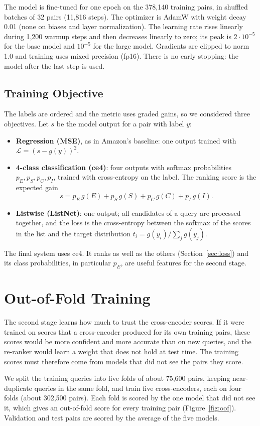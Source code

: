 \documentclass[12pt,a4paper]{report}
\begin{document}
The model is fine-tuned for one epoch on the 378,140 training pairs, in shuffled batches of 32 pairs (11,816 steps). The optimizer is AdamW with weight decay 0.01 (none on biases and layer normalization). The learning rate rises linearly during 1,200 warmup steps and then decreases linearly to zero; its peak is $2\cdot10^{-5}$ for the base model and $10^{-5}$ for the large model. Gradients are clipped to norm 1.0 and training uses mixed precision (fp16). There is no early stopping: the model after the last step is used.

\subsection{Training Objective}
The labels are ordered and the metric uses graded gains, so we considered three objectives. Let $s$ be the model output for a pair with label $y$:
\begin{itemize}
  \item \textbf{Regression (MSE)}, as in Amazon's baseline: one output trained with $\mathcal{L} = (s - g(y))^2$.
  \item \textbf{4-class classification (ce4)}: four outputs with softmax probabilities $p_E, p_S, p_C, p_I$, trained with cross-entropy on the label. The ranking score is the expected gain
  \[ s = p_E\,g(E) + p_S\,g(S) + p_C\,g(C) + p_I\,g(I). \]
  \item \textbf{Listwise (ListNet)}: one output; all candidates of a query are processed together, and the loss is the cross-entropy between the softmax of the scores in the list and the target distribution $t_i = g(y_i)/\sum_j g(y_j)$.
\end{itemize}
The final system uses ce4. It ranks as well as the others (Section~\ref{sec:loss}) and its class probabilities, in particular $p_E$, are useful features for the second stage.

\section{Out-of-Fold Training}
The second stage learns how much to trust the cross-encoder scores. If it were trained on scores that a cross-encoder produced for its own training pairs, these scores would be more confident and more accurate than on new queries, and the re-ranker would learn a weight that does not hold at test time. The training scores must therefore come from models that did not see the pairs they score.

We split the training queries into five folds of about 75,600 pairs, keeping near-duplicate queries in the same fold, and train five cross-encoders, each on four folds (about 302,500 pairs). Each fold is scored by the one model that did not see it, which gives an out-of-fold score for every training pair (Figure~\ref{fig:oof}). Validation and test pairs are scored by the average of the five models.
\end{document}
